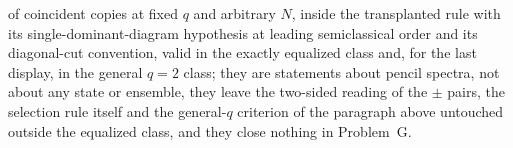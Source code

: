 of coincident copies at fixed \(q\) and arbitrary \(N\), inside the transplanted rule with its single-dominant-diagram hypothesis at leading semiclassical order and its diagonal-cut convention, valid in the exactly equalized class and, for the last display, in the general \(q=2\) class; they are statements about pencil spectra, not about any state or ensemble, they leave the two-sided reading of the \(\pm\) pairs, the selection rule itself and the general-\(q\) criterion of the paragraph above untouched outside the equalized class, and they close nothing in Problem~G.
